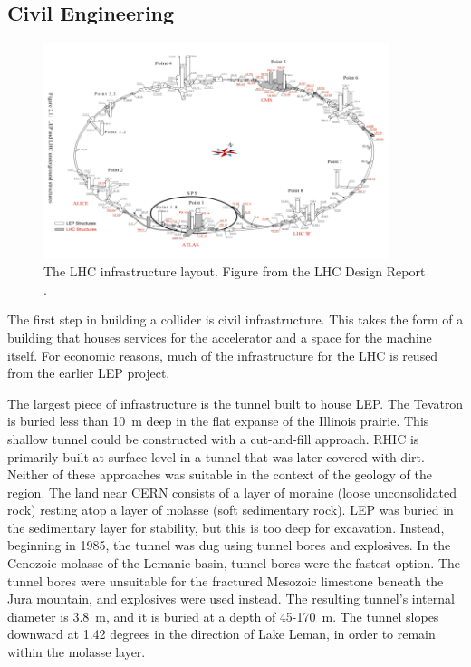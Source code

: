 \subsection{Civil Engineering}

\begin{figure}[h!]
\captionsetup[subfigure]{position=b}
\centering
\includegraphics[width=0.9\textwidth]{figures/experiment/lhcLepLayout.png}
\caption{The LHC infrastructure layout. Figure from the LHC Design Report \cite{lhcDesignV2}.}
\label{figure:lhcLayout}
\end{figure}


The first step in building a collider is civil infrastructure.
This takes the form of a building that houses services for the accelerator and a space for the machine itself.
For economic reasons, much of the infrastructure for the LHC is reused from the earlier LEP project.

The largest piece of infrastructure is the tunnel built to house LEP.
The Tevatron is buried less than 10~m deep in the flat expanse of the Illinois prairie. This shallow tunnel could be constructed with a cut-and-fill approach.
RHIC is primarily built at surface level in a tunnel that was later covered with dirt.
Neither of these approaches was suitable in the context of the geology of the region.
The land near CERN consists of a layer of moraine (loose unconsolidated rock) resting atop a layer of molasse (soft sedimentary rock).
LEP was buried in the sedimentary layer for stability, but this is too deep for excavation.
Instead, beginning in 1985, the tunnel was dug using tunnel bores and explosives.
In the Cenozoic molasse of the Lemanic basin, tunnel bores were the fastest option.
The tunnel bores were unsuitable for the fractured Mesozoic limestone beneath the Jura mountain, and explosives were used instead.
The resulting tunnel's internal diameter is 3.8~m, and it is buried at a depth of 45-170~m.
The tunnel slopes downward at 1.42 degrees in the direction of Lake Leman, in order to remain within the molasse layer.

